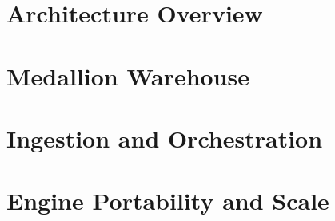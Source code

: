 
\section{Architecture Overview}
\label{sec:arch:overview}

\section{Medallion Warehouse}
\label{sec:arch:medallion}

\section{Ingestion and Orchestration}
\label{sec:arch:ingestion}

\section{Engine Portability and Scale}
\label{sec:arch:scale}
